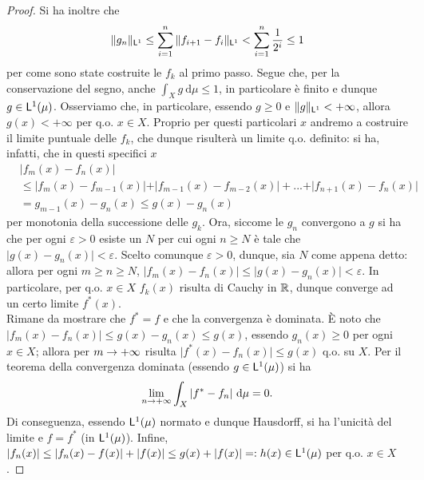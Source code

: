 \documentclass[Completo.tex]{subfiles}
\begin{document}
\begin{proof}
		Si ha inoltre che
		\begin{equation*}
		\Vert g_n \Vert_{\sf[L]^1} \leq \sum_{i = 1}^{n} \Vert f_{i+1} - f_{i} \Vert_{\sf[L]^1} < \sum_{i = 1}^{n} \frac{1}{2^i} \leq 1
		\end{equation*}
		per come sono state costruite le $f_k$ al primo passo. Segue che, per la conservazione del segno, anche $\int_X g \ \mathrm{d}\mu \leq 1$, in particolare è finito e dunque $g \in \sf[L]^1(\mu)$. Osserviamo che, in particolare, essendo $g \geq 0$ e $\Vert g \Vert_{\sf[L]^1} < +\infty$, allora $g(x) < +\infty$ per q.o. $x \in X$. Proprio per questi particolari $x$ andremo a costruire il limite puntuale delle $f_k$, che dunque risulterà un limite q.o. definito: si ha, infatti, che in questi specifici $x$
		\begin{align*}
		& \vert f_m(x) - f_n(x) \vert \\
		& \leq \vert f_m(x) - f_{m-1}(x) \vert + \vert f_{m-1}(x) - f_{m-2}(x) \vert + ... + \vert f_{n+1}(x) - f_{n}(x) \vert \\
		& = g_{m-1}(x) - g_n(x) \leq g(x) - g_n(x)
		\end{align*}
		per monotonia della successione delle $g_k$. Ora, siccome le $g_n$ convergono a $g$ si ha che per ogni $\varepsilon > 0$ esiste un $N$ per cui ogni $n \geq N$ è tale che $\vert g(x) - g_n(x) \vert < \varepsilon$. Scelto comunque $\varepsilon > 0$, dunque, sia $N$ come appena detto: allora per ogni $m \geq n \geq N$, $\vert f_m(x) - f_n(x) \vert \leq \vert g(x) - g_n(x) \vert < \varepsilon$. In particolare, per q.o. $x \in X$ $f_k(x)$ risulta di Cauchy in $\bb[R]$, dunque converge ad un certo limite $f^{*}(x)$. \\
		Rimane da mostrare che $f^{*} = f$ e che la convergenza è dominata. È noto che $\vert f_m(x) - f_n(x) \vert \leq g(x) - g_n(x) \leq g(x)$, essendo $g_n(x) \geq 0$ per ogni $x \in X$; allora per $m \rightarrow +\infty$ risulta $\vert f^{*}(x) - f_n(x) \vert \leq g(x)$ q.o. su $X$. Per il teorema della convergenza dominata (essendo $g \in \sf[L]^1(\mu)$) si ha
		\begin{equation*}
		\lim_{n \rightarrow +\infty} \int_X \vert f^{*} - f_n \vert \ \mathrm{d}\mu = 0.
		\end{equation*}
		Di conseguenza, essendo $\sf[L]^1(\mu)$ normato e dunque Hausdorff, si ha l'unicità del limite e $f = f^{*}$ (in $\sf[L]^1(\mu)$). Infine, $\vert f_n(x) \vert \leq \vert f_n(x) - f(x) \vert + \vert f(x) \vert \leq g(x) + \vert f(x) \vert =: h(x) \in \sf[L]^1(\mu)$ per q.o. $x \in X$.
	\end{proof}
\end{document}
